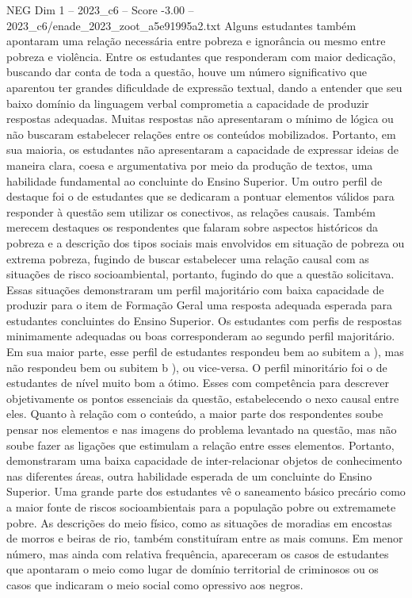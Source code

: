 \begin{textsample}{NEG Dim 1 – 2023\_c6 – Score -3.00 – 2023\_c6/enade\_2023\_zoot\_a5e91995a2.txt}
Alguns estudantes também apontaram uma relação necessária entre pobreza e ignorância ou mesmo entre pobreza e violência.
Entre os estudantes que responderam com maior dedicação, buscando dar conta de toda a questão, houve um número significativo que aparentou ter grandes dificuldade de expressão textual, dando a entender que seu baixo domínio da linguagem verbal comprometia a capacidade de produzir respostas adequadas.
Muitas respostas não apresentaram o mínimo de lógica ou não buscaram estabelecer relações entre os conteúdos mobilizados.
Portanto, em sua maioria, os estudantes não apresentaram a capacidade de expressar ideias de maneira clara, coesa e argumentativa por meio da produção de textos, uma habilidade fundamental ao concluinte do Ensino Superior.
Um outro perfil de destaque foi o de estudantes que se dedicaram a pontuar elementos válidos para responder à questão sem utilizar os conectivos, as relações causais.
Também merecem destaques os respondentes que falaram sobre aspectos históricos da pobreza e a descrição dos tipos sociais mais envolvidos em situação de pobreza ou extrema pobreza, fugindo de buscar estabelecer uma relação causal com as situações de risco socioambiental, portanto, fugindo do que a questão solicitava.
Essas situações demonstraram um perfil majoritário com baixa capacidade de produzir para o item de Formação Geral uma resposta adequada esperada para estudantes concluintes do Ensino Superior.
Os estudantes com perfis de respostas minimamente adequadas ou boas corresponderam ao segundo perfil majoritário.
Em sua maior parte, esse perfil de estudantes respondeu bem ao subitem a ), mas não respondeu bem ou subitem b ), ou vice-versa.
O perfil minoritário foi o de estudantes de nível muito bom a ótimo.
Esses com competência para descrever objetivamente os pontos essenciais da questão, estabelecendo o nexo causal entre eles.
Quanto à relação com o conteúdo, a maior parte dos respondentes soube pensar nos elementos e nas imagens do problema levantado na questão, mas não soube fazer as ligações que estimulam a relação entre esses elementos.
Portanto, demonstraram uma baixa capacidade de inter-relacionar objetos de conhecimento nas diferentes áreas, outra habilidade esperada de um concluinte do Ensino Superior.
Uma grande parte dos estudantes vê o saneamento básico precário como a maior fonte de riscos socioambientais para a população pobre ou extremamete pobre.
As descrições do meio físico, como as situações de moradias em encostas de morros e beiras de rio, também constituíram entre as mais comuns.
Em menor número, mas ainda com relativa frequência, apareceram os casos de estudantes que apontaram o meio como lugar de domínio territorial de criminosos ou os casos que indicaram o meio social como opressivo aos negros.

\end{textsample}

